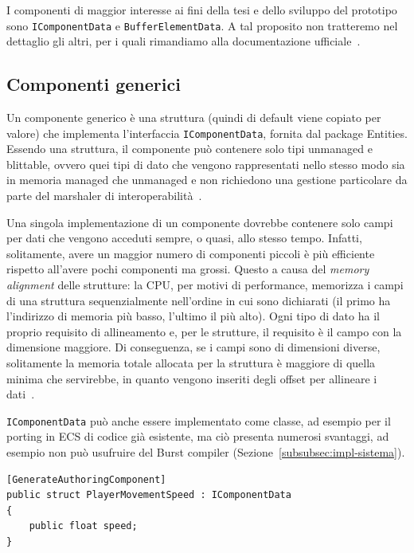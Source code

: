 I componenti di maggior interesse ai fini della tesi e dello sviluppo del prototipo sono \verb|IComponentData| e \verb|BufferElementData|. A tal proposito non tratteremo nel dettaglio gli altri, per i quali rimandiamo alla documentazione ufficiale~\cite{doc:unity-entities-manual}.

\subsection{Componenti generici}
Un componente generico è una struttura (quindi di default viene copiato per valore) che implementa l'interfaccia \verb|IComponentData|, fornita dal package Entities. Essendo una struttura, il componente può contenere solo tipi unmanaged e blittable, ovvero quei tipi di dato che vengono rappresentati nello stesso modo sia in memoria managed che unmanaged e non richiedono una gestione particolare da parte del marshaler di interoperabilità~\cite{doc:microsoft-blittable-types}.

Una singola implementazione di un componente dovrebbe contenere solo campi per dati che vengono acceduti sempre, o quasi, allo stesso tempo. Infatti, solitamente, avere un maggior numero di componenti piccoli è più efficiente rispetto all'avere pochi componenti ma grossi. Questo a causa del \emph{memory alignment} delle strutture: la CPU, per motivi di performance, memorizza i campi di una struttura sequenzialmente nell'ordine in cui sono dichiarati (il primo ha l'indirizzo di memoria più basso, l'ultimo il più alto). Ogni tipo di dato ha il proprio requisito di allineamento e, per le strutture, il requisito è il campo con la dimensione maggiore. Di conseguenza, se i campi sono di dimensioni diverse, solitamente la memoria totale allocata per la struttura è maggiore di quella minima che servirebbe, in quanto vengono inseriti degli offset per allineare i dati~\cite{doc:microsoft-memory-alignment}.

\verb|IComponentData| può anche essere implementato come classe, ad esempio per il porting in ECS di codice già esistente, ma ciò presenta numerosi svantaggi, ad esempio non può usufruire del Burst compiler (Sezione~\ref{subsubsec:impl-sistema}).

\begin{lstlisting}[caption={Prototipo: esempio di componente generico.},label={lst:generic-component-example},language={[Sharp]C}]
[GenerateAuthoringComponent]
public struct PlayerMovementSpeed : IComponentData
{
    public float speed;
}
\end{lstlisting}

